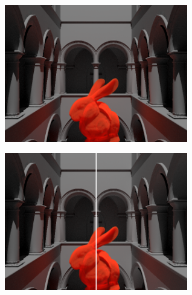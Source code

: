 \documentclass[10pt,compress,professionalfont]{beamer}
\begin{document}
\begin{frame}[c]{}

    {\centering
    \includegraphics[width=80mm]{../img/sponza}\\
    }

\end{frame}




\begin{frame}[c]{}

    {\centering
    \includegraphics[width=80mm]{../img/compare}\\
    }

\end{frame}
\end{document}
